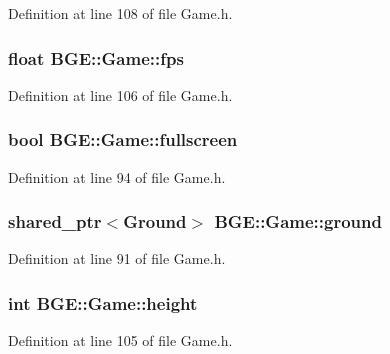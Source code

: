 Definition at line 108 of file Game.\-h.

\hypertarget{class_b_g_e_1_1_game_a6827ac220d27fc4be181235f39f148c2}{
\subsubsection[{fps}]{\setlength{\rightskip}{0pt plus 5cm}float B\-G\-E\-::\-Game\-::fps}}\label{class_b_g_e_1_1_game_a6827ac220d27fc4be181235f39f148c2}


Definition at line 106 of file Game.\-h.

\hypertarget{class_b_g_e_1_1_game_a6ccd351839e577cef28ffab9b64fb576}{
\subsubsection[{fullscreen}]{\setlength{\rightskip}{0pt plus 5cm}bool B\-G\-E\-::\-Game\-::fullscreen}}\label{class_b_g_e_1_1_game_a6ccd351839e577cef28ffab9b64fb576}


Definition at line 94 of file Game.\-h.

\hypertarget{class_b_g_e_1_1_game_a116334f4ca84d0941072968b941b8c39}{
\subsubsection[{ground}]{\setlength{\rightskip}{0pt plus 5cm}shared\-\_\-ptr$<${\bf Ground}$>$ B\-G\-E\-::\-Game\-::ground}}\label{class_b_g_e_1_1_game_a116334f4ca84d0941072968b941b8c39}


Definition at line 91 of file Game.\-h.

\hypertarget{class_b_g_e_1_1_game_ac012b897d5a88993c5c77cd633338a0e}{
\subsubsection[{height}]{\setlength{\rightskip}{0pt plus 5cm}int B\-G\-E\-::\-Game\-::height}}\label{class_b_g_e_1_1_game_ac012b897d5a88993c5c77cd633338a0e}


Definition at line 105 of file Game.\-h.


